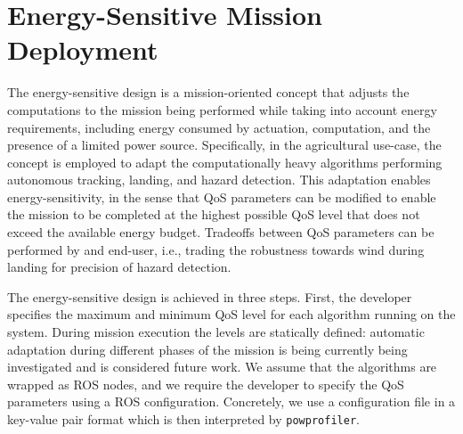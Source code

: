 \documentclass[conference]{IEEEtran}
\newcommand{\stt}[1]{{\small\tt #1}} %
\newcommand{\powprof}{\stt{powprofiler}}
\begin{document}
\section{Energy-Sensitive Mission Deployment} 
\label{sec:approach}


The energy-sensitive design is a mission-oriented concept that adjusts the computations to the mission being performed while taking into account energy requirements, including energy consumed by actuation, computation, and the presence of a limited power source. Specifically, in the agricultural use-case, the concept is employed to adapt the computationally heavy algorithms performing autonomous tracking, landing, and hazard detection. This adaptation enables energy-sensitivity, in the sense that QoS parameters can be modified to enable the mission to be completed at the highest possible QoS level that does not exceed the available energy budget. Tradeoffs between QoS parameters can be performed by and end-user, i.e., trading the robustness towards wind during landing for precision of hazard detection.

The energy-sensitive design is achieved in three steps.
%
First, the developer specifies the maximum and minimum QoS level for each algorithm running on the system. %
During mission execution the levels are statically defined: automatic adaptation during different phases of the mission is being currently being investigated and is considered future work. 
We assume that the algorithms are wrapped as ROS nodes, and we require the developer to specify the QoS parameters using a ROS configuration. Concretely, we use a configuration file in a key-value pair format which is then interpreted by \powprof{}.
\end{document}
